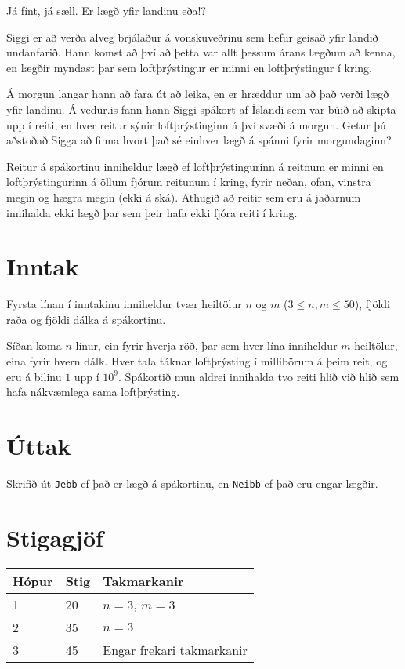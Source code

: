 
Já fínt, já sæll. Er lægð yfir landinu eða!?

Siggi er að verða alveg brjálaður á vonskuveðrinu sem hefur geisað yfir landið
undanfarið. Hann komst að því að þetta var allt þessum árans lægðum að kenna,
en lægðir myndast þar sem loftþrýstingur er minni en loftþrýstingur í kring.

Á morgun langar hann að fara út að leika, en er hræddur um að það verði lægð
yfir landinu. Á vedur.is fann hann Siggi spákort af Íslandi sem var búið að
skipta upp í reiti, en hver reitur sýnir loftþrýstinginn á því svæði á morgun.
Getur þú aðstoðað Sigga að finna hvort það sé einhver lægð á spánni fyrir
morgundaginn?

Reitur á spákortinu inniheldur lægð ef loftþrýstingurinn á reitnum er minni en
loftþrýstingurinn á öllum fjórum reitunum í kring, fyrir neðan, ofan, vinstra
megin og hægra megin (ekki á ská). Athugið að reitir sem eru á jaðarnum
innihalda ekki lægð þar sem þeir hafa ekki fjóra reiti í kring.

\section*{Inntak}
Fyrsta línan í inntakinu inniheldur tvær heiltölur $n$ og $m$ ($3 \leq n,m \leq
50$), fjöldi raða og fjöldi dálka á spákortinu.

Síðan koma $n$ línur, ein fyrir hverja röð, þar sem hver lína inniheldur $m$
heiltölur, eina fyrir hvern dálk. Hver tala táknar loftþrýsting í millibörum á
þeim reit, og eru á bilinu $1$ upp í $10^9$. Spákortið mun aldrei innihalda tvo
reiti hlið við hlið sem hafa nákvæmlega sama loftþrýsting.

\section*{Úttak}
Skrifið út \texttt{Jebb} ef það er lægð á spákortinu, en \texttt{Neibb} ef það
eru engar lægðir.

\section*{Stigagjöf}
\begin{tabular}{|l|l|l|}
\hline
Hópur & Stig & Takmarkanir \\ \hline
1     & 20   & $n = 3$, $m = 3$ \\ \hline
2     & 35   & $n = 3$ \\ \hline
3     & 45   & Engar frekari takmarkanir\\ \hline
\end{tabular}

